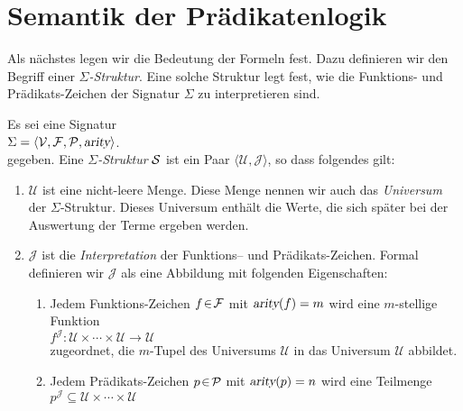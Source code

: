 \section{Semantik der Pr\"{a}dikatenlogik}
Als n\"{a}chstes legen wir die Bedeutung der Formeln fest.  Dazu definieren wir 
den Begriff einer {\emph{\color{blue}$\Sigma$-Struktur}}.  Eine solche Struktur legt fest, wie die
Funktions- und Pr\"{a}dikats-Zeichen der Signatur $\Sigma$ zu interpretieren sind.

\begin{Definition}[Struktur]
    Es sei eine  Signatur \\[0.2cm]
    \hspace*{1.3cm} $\Sigma = \langle \mathcal{V}, \mathcal{F}, \mathcal{P}, \textsl{arity} \rangle$. \\[0.2cm]
    gegeben. Eine {\emph{\color{blue}$\Sigma$-Struktur}} $\mathcal{S}$ ist ein
    Paar $\langle \mathcal{U}, \mathcal{J} \rangle$, so dass folgendes gilt:
    \begin{enumerate}
        \item $\mathcal{U}$ ist eine nicht-leere Menge. Diese Menge nennen wir auch das
              {\emph{\color{blue}Universum}} der $\Sigma$-Struktur.  Dieses Universum enth\"{a}lt die Werte,
              die sich sp\"{a}ter bei der Auswertung der Terme ergeben werden.
        \item $\mathcal{J}$ ist die {\emph{\color{blue}Interpretation}} der Funktions-- und Pr\"{a}dikats-Zeichen.
              Formal definieren wir $\mathcal{J}$ als eine Abbildung mit folgenden Eigenschaften:
        \begin{enumerate}
        \item Jedem Funktions-Zeichen $f \!\in\! \mathcal{F}$ mit $\textsl{arity}(f) = m$ wird
              eine $m$-stellige Funktion \\[0.2cm]
              \hspace*{1.3cm}
              $f^\mathcal{J}\colon \mathcal{U} \times \cdots \times \mathcal{U} \rightarrow \mathcal{U}$ \\[0.2cm]
              zugeordnet, die $m$-Tupel des Universums $\mathcal{U}$ in das Universum $\mathcal{U}$ abbildet.
        \item Jedem Pr\"{a}dikats-Zeichen $p \!\in\! \mathcal{P}$ mit $\textsl{arity}(p) = n$ wird
              eine Teilmenge \\[0.2cm]
              \hspace*{1.3cm} 
              $p^\mathcal{J} \subseteq \mathcal{U} \times \cdots \times \mathcal{U}$ \\[0.2cm]

\end{enumerate}
\end{enumerate}
\end{Definition}
